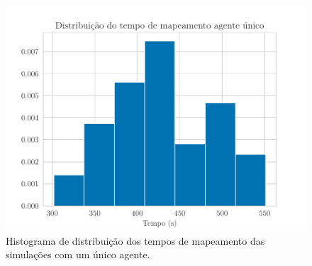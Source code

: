 \begin{figure}
  \centering
  \includegraphics[width=.7\textwidth]{figs/time-coverage-single-agent.pdf}
  \caption[Distribuição do tempo de mapeamento de um único agente]{Histograma de distribuição dos tempos de mapeamento das simulações com um único agente.}
  \label{fig:time-coverage-single-agent}
\end{figure}

